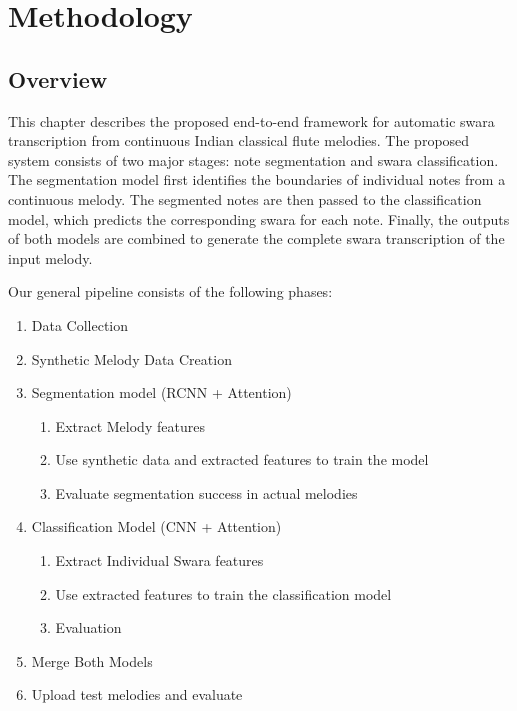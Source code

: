 \chapter{Methodology}
\label{ch:methodology}

\section{Overview}

This chapter describes the proposed end-to-end framework for automatic swara transcription from continuous Indian classical flute melodies. The proposed system consists of two major stages: note segmentation and swara classification. The segmentation model first identifies the boundaries of individual notes from a continuous melody. The segmented notes are then passed to the classification model, which predicts the corresponding swara for each note. Finally, the outputs of both models are combined to generate the complete swara transcription of the input melody.

Our general pipeline consists of the following phases:
\begin{enumerate}
    \item Data Collection
    \item Synthetic Melody Data Creation
    \item Segmentation model (RCNN + Attention)
    \begin{enumerate}
        \item Extract Melody features
        \item Use synthetic data and extracted features to train the model
        \item Evaluate segmentation success in actual melodies
    \end{enumerate}
    \item Classification Model (CNN + Attention)
    \begin{enumerate}
        \item Extract Individual Swara features
        \item Use extracted features to train the classification model
        \item Evaluation
    \end{enumerate}
    \item Merge Both Models
    \item Upload test melodies and evaluate
\end{enumerate}

